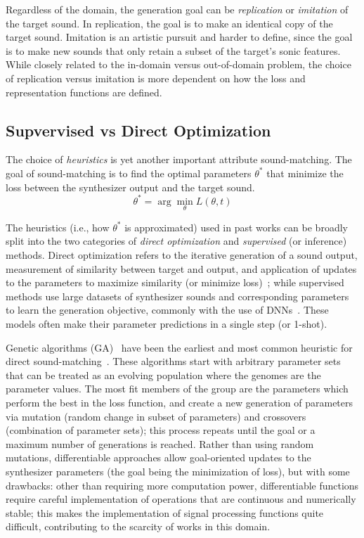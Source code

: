 \documentclass[lettersize,journal]{IEEEtran}
\providecommand{\gls}[1]{#1}
\begin{document}
Regardless of the domain, the generation goal can be \textit{replication} or \textit{imitation} of the target sound. In replication, the goal is to make an identical copy of the target sound. Imitation is an artistic pursuit and harder to define, since the goal is to make new sounds that only retain a subset of the target's sonic features. While closely related to the in-domain versus out-of-domain problem, the choice of replication versus imitation is more dependent on how the loss and representation functions are defined. 

\subsection{Supvervised vs Direct Optimization}
\label{sec:optimization}

The choice of \textit{heuristics} is yet another important attribute sound-matching. The goal of sound-matching is to find the optimal parameters $\theta^*$ that minimize the loss between the synthesizer output and the target sound. 
\[
\theta^* = \arg\min_{\theta} L(\theta,t)
\]

The heuristics (i.e., how $\theta^*$ is approximated) used in past works can be broadly split into the two categories of \textit{direct optimization} and \textit{supervised}  (or inference) methods. Direct optimization refers to the iterative generation of a sound output, measurement of similarity between target and output, and application of updates to the parameters to maximize similarity (or minimize loss)~\cite{horner1993machine,mitchell2007evolutionary,yee2018automatic,vahidi2023mesostructures}; while supervised methods use large datasets of synthesizer sounds and corresponding parameters to learn the generation objective, commonly with the use of DNNs~\cite{engel2020ddsp,salimi2020make,yee2018automatic,esling2019flow}. These models often make their parameter predictions in a single step (or 1-shot). 

Genetic algorithms (\gls{GA})~\cite{holland1992genetic} have been the earliest and most common heuristic for direct sound-matching~\cite{horner1993machine,mitchell2007evolutionary,yee2018automatic}. These algorithms start with arbitrary parameter sets that can be treated as an evolving population where the genomes are the parameter values. The most fit members of the group are the parameters which perform the best in the loss function, and create a new generation of parameters via mutation (random change in subset of parameters) and crossovers (combination of parameter sets); this process repeats until the goal or a maximum number of generations is reached. Rather than using random mutations, differentiable approaches allow goal-oriented updates to the synthesizer parameters (the goal being the minimization of loss), but with some drawbacks: other than requiring more computation power, differentiable functions require careful implementation of operations that are continuous and numerically stable; this makes the implementation of signal processing functions quite difficult, contributing to the scarcity of works in this domain.
\end{document}
